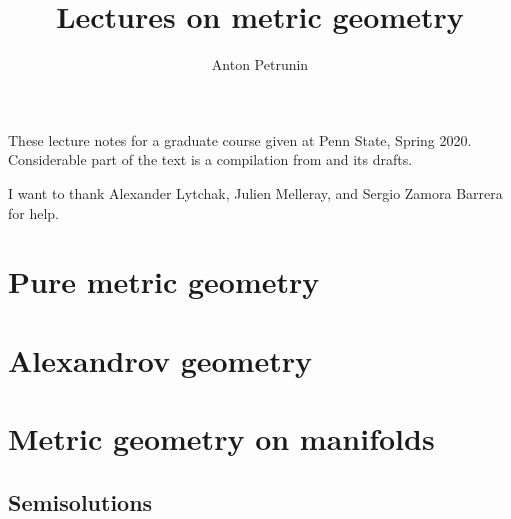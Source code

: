 \documentclass[twoside]{book}
\begin{document}
 
\title{Lectures on metric geometry}
\author{Anton Petrunin}
\date{}
\maketitle

These lecture notes for a graduate course given at Penn State, Spring 2020.
Considerable part of the text is a compilation from \cite{alexander-kapovitch-petrunin-2019, alexander-kapovitch-petrunin-2025, petrunin-yashinski, petrunin-2022-PIGTIKAL, petrunin-zamorabarrera} and its drafts.

I want to thank Alexander Lytchak,
Julien Melleray,
and Sergio Zamora Barrera for help.

\thispagestyle{empty}
\tableofcontents
\thispagestyle{empty}

%
\part{Pure metric geometry}




%


\part{Alexandrov geometry}







\part{Metric geometry on manifolds}


%
%
%

\backmatter

\chapter{Semisolutions}

{

\footnotesize
\begin{multicols}{2}







\end{multicols}
}

%
{\small\sloppy


\def\emph{\textit}

\printbibliography[heading=bibintoc]
\fussy
}
\end{document}
